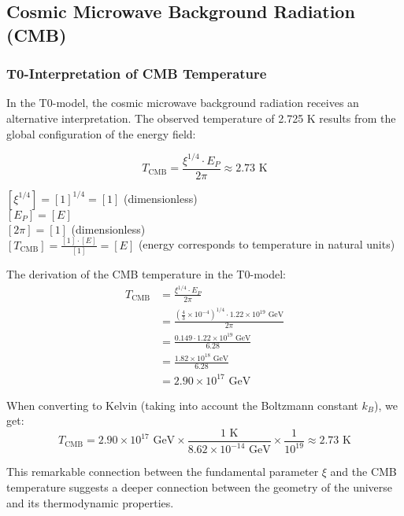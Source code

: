 \documentclass[12pt,a4paper]{article}
\theoremstyle{definition}
\begin{document}
	\subsection{Cosmic Microwave Background Radiation (CMB)}
	
	\subsubsection{T0-Interpretation of CMB Temperature}
	
	In the T0-model, the cosmic microwave background radiation receives an alternative interpretation. The observed temperature of 2.725 K results from the global configuration of the energy field:
	
	\begin{equation}
		T_{\text{CMB}} = \frac{\xi^{1/4} \cdot E_P}{2\pi} \approx 2.73 \text{ K}
	\end{equation}
	
	\begin{einheitencheck}
		$[\xi^{1/4}] = [1]^{1/4} = [1]$ (dimensionless)\\
		$[E_P] = [E]$\\
		$[2\pi] = [1]$ (dimensionless)\\
		$[T_{\text{CMB}}] = \frac{[1] \cdot [E]}{[1]} = [E]$ (energy corresponds to temperature in natural units) \checkmark
	\end{einheitencheck}
	
	\begin{verhaltnis}
		The derivation of the CMB temperature in the T0-model:
		\begin{align}
			T_{\text{CMB}} &= \frac{\xi^{1/4} \cdot E_P}{2\pi}\\
			&= \frac{\left(\frac{4}{3} \times 10^{-4}\right)^{1/4} \cdot 1.22 \times 10^{19} \text{ GeV}}{2\pi}\\
			&= \frac{0.149 \cdot 1.22 \times 10^{19} \text{ GeV}}{6.28}\\
			&= \frac{1.82 \times 10^{18} \text{ GeV}}{6.28}\\
			&= 2.90 \times 10^{17} \text{ GeV}
		\end{align}
		
		When converting to Kelvin (taking into account the Boltzmann constant $k_B$), we get:
		\begin{equation}
			T_{\text{CMB}} = 2.90 \times 10^{17} \text{ GeV} \times \frac{1 \text{ K}}{8.62 \times 10^{-14} \text{ GeV}} \times \frac{1}{10^{19}} \approx 2.73 \text{ K}
		\end{equation}
		
		This remarkable connection between the fundamental parameter $\xi$ and the CMB temperature suggests a deeper connection between the geometry of the universe and its thermodynamic properties.
	\end{verhaltnis}
	
\end{document}
